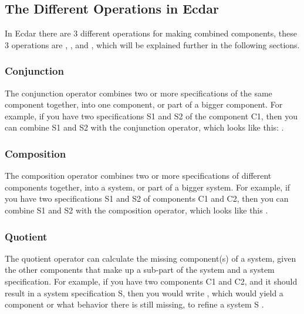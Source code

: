 \subsection{The Different Operations in Ecdar} \label{RevaeelOperations}
In Ecdar there are 3 different operations for making combined components, these 3 operations are , , and , which will be explained further in the following sections.

\subsubsection*{Conjunction} \label{The-Different-Operations-In-Ecdar:Conjunction}
The conjunction operator combines two or more specifications of the same component together, into one component, or part of a bigger component. 
For example, if you have two specifications S1 and S2 of the component C1, then you can combine S1 and S2 with the conjunction operator, which looks like this:  \cite{goorden_specification_2022}.

\subsubsection*{Composition} \label{The-Different-Operations-In-Ecdar:Composition}
The composition operator combines two or more specifications of different components together, into a system, or part of a bigger system. 
For example, if you have two specifications S1 and S2 of components C1 and C2, then you can combine S1 and S2 with the composition operator, which looks like this  \cite{goorden_specification_2022}.

\subsubsection*{Quotient} \label{The-Different-Operations-In-Ecdar:Quotient}
The quotient operator can calculate the missing component(s) of a system, given the other components that make up a sub-part of the system and a system specification. For example, if you have two components C1 and C2, and it should result in a system specification S, then you would write , which would yield a component or what behavior there is still missing, to refine a system S \cite{goorden_specification_2022}.